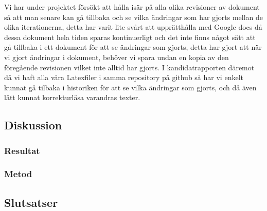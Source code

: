 Vi har under projektet försökt att hålla isär på alla olika revisioner av dokument så att man senare kan gå tillbaka och se vilka ändringar som har gjorts mellan de olika iterationerna, detta har varit lite svårt att upprätthålla med Google docs då dessa dokument hela tiden sparas kontinuerligt och det inte finns något sätt att gå tillbaka i ett dokument för att se ändringar som gjorts, detta har gjort att när vi gjort ändringar i dokument, behöver vi spara undan en kopia av den föregående revisionen vilket inte alltid har gjorts. I kandidatrapporten däremot då vi haft alla våra Latexfiler i samma repository på github så har vi enkelt kunnat gå tilbaka i historiken för att se vilka ändringar som gjorts, och då även lätt kunnat korrekturläsa varandras texter.
\subsection{Diskussion}
\subsubsection{Resultat}
\subsubsection{Metod}
\subsection{Slutsatser}

